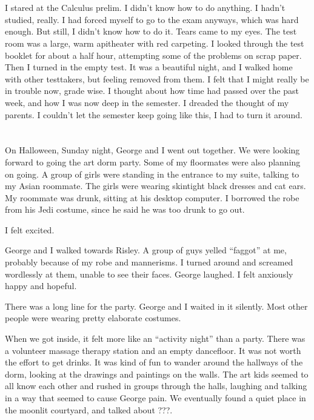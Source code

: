 \section{}

I stared at the Calculus prelim.  I didn't know how to do anything.  I hadn't
studied, really. I had forced myself to go to the exam anyways, which was hard
enough.  But still, I didn't know how to do it.  Tears came to my eyes.  The
test room was a large, warm apitheater with red carpeting. I looked through the
test booklet for about a half hour, attempting some of the problems on scrap
paper.    Then I turned in the empty test.  It was a beautiful night, and I
walked home with other testtakers, but feeling removed from them.  I felt that I
might really be in trouble now, grade wise.  I thought about how time had passed
over the past week, and how I was now deep in the semester.  I dreaded the
thought of my parents.  I couldn't let the semester keep going like this, I had
to turn it around.

\section{}

On Halloween, Sunday night, George and I went out together.  We were looking
forward to going the art dorm party.  Some of my floormates were also planning
on going.  A group of girls were standing in the entrance to my suite, talking
to my Asian roommate.  The girls were wearing skintight black dresses and cat
ears.  My roommate was drunk, sitting at his desktop computer.  I borrowed the
robe from his Jedi costume, since he said he was too drunk to go out. 

I felt excited.

George and I walked towards Risley.  A group of guys yelled ``faggot'' at me,
probably because of my robe and mannerisms.  I turned around and screamed
wordlessly at them, unable to see their faces.  George laughed.  I felt
anxiously happy and hopeful.

There was a long line for the party.  George and I waited in it silently.  Most
other people were wearing pretty elaborate costumes.

When we got inside, it felt more like an ``activity night'' than a party.  There
was a volunteer massage therapy station and an empty dancefloor.  It was not
worth the effort to get drinks.  It was kind of fun to wander around the
hallways of the dorm, looking at the drawings and paintings on the walls.  The
art kids seemed to all know each other and rushed in groups through the halls,
laughing and talking in a way that seemed to cause George pain.  We eventually
found a quiet place in the moonlit courtyard, and talked about ???. 

